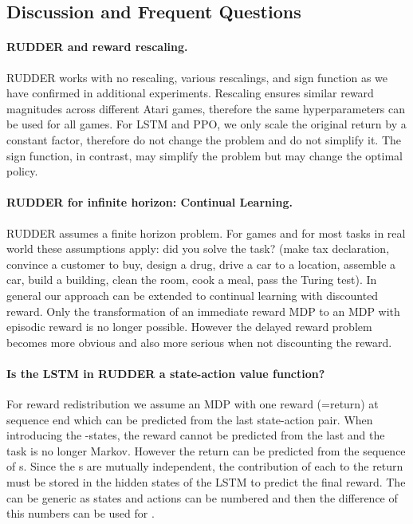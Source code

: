 \documentclass{article}
\begin{document}
\begin{appendices}
\clearpage
\pagebreak
\section{Discussion and Frequent Questions}

\paragraph{RUDDER and reward rescaling.}
RUDDER works with no rescaling, various rescalings, and sign function 
as we have confirmed in additional experiments.
Rescaling ensures similar reward magnitudes across different Atari games, 
therefore the same hyperparameters can be used for all games. 
For LSTM and PPO, we only scale the original return by a constant factor, 
therefore do not change the problem and do not simplify it. 
The sign function, in contrast, may simplify the problem 
but may change the optimal policy.

\paragraph{RUDDER for infinite horizon: Continual Learning.}
RUDDER assumes a finite horizon problem.
For games and for most tasks in real world these assumptions apply: 
did you solve the task? (make tax declaration, convince a customer to buy, 
design a drug, drive a car to a location, 
assemble a car, build a building, clean the room, cook a meal, pass the Turing test). 
In general our approach can be extended to continual learning with discounted reward. 
Only the transformation of an immediate reward MDP 
to an MDP with episodic reward is no longer possible. 
However the delayed reward problem becomes more obvious and also 
more serious when not discounting the reward.

\paragraph{Is the LSTM in RUDDER a state-action value function?}
For reward redistribution we assume an MDP with one reward (=return) 
at sequence end which can be predicted from the last state-action pair. 
When introducing the -states, 
the reward cannot be predicted from the last  
and the task is no longer Markov. 
However the return can be predicted from the sequence of s. 
Since the s are mutually independent, 
the contribution of each  to the return must be stored 
in the hidden states of the LSTM to predict the final reward. 
The  can be generic as states and actions can be numbered 
and then the difference of this numbers can be used for .


\end{appendices}
\end{document}
